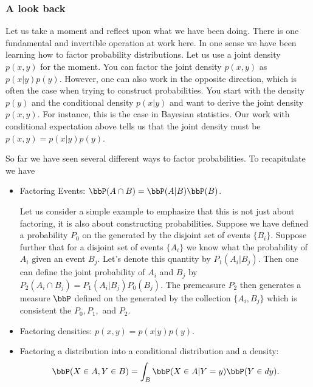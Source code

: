 \documentclass{report}
\begin{document}
\subsubsection{A look back}

Let us take a moment and reflect upon what we have been doing.  There is one fundamental and invertible operation at work here.  In one sense we have been learning how to factor probability distributions. Let us use a joint density $p(x,y)$ for the moment.  You can factor the joint density $p(x,y)$ as $p(x|y)p(y)$.  However, one can also work in the opposite direction, which is often the case when trying to construct probabilities.  You start with the density $p(y)$ and the conditional density $p(x|y)$ and want to derive the joint density $p(x,y)$.  For instance, this is the case in Bayesian statistics.  Our work with conditional expectation above tells us that the joint density must be $p(x,y) = p(x|y)p(y)$.

So far we have seen several different ways to factor probabilities.  To recapitulate we have
\begin{itemize}
\item Factoring Events: $\bbP(A \cap B) = \bbP(A | B) \bbP(B)$.  

Let us consider a simple example to emphasize that this is not just about factoring, it is also about constructing probabilities.  Suppose we have defined a probability $P_0$ on the \sigalg generated by the disjoint set of events $\{B_i\}$.  Suppose further that for a disjoint set of events $\{A_i\}$ we know what the probability of $A_i$ given an event $B_j$.  Let's denote this quantity by $P_1(A_i | B_j)$.  Then one can define the joint probability of $A_i$ and $B_j$ by $P_2(A_i \cap B_j) = P_1(A_i | B_j) P_0(B_j)$.  The premeasure $P_2$ then generates a measure $\bbP$ defined on the \sigalg generated by the collection $\{A_i,B_j\}$ which is consistent the $P_0, P_1,$ and $P_2$.
\item Factoring densities: $p(x,y) = p(x|y)p(y)$.
\item Factoring a distribution into a conditional distribution and a density:
\[
\bbP(X \in A, Y \in B) = \int_B \bbP(X \in A | Y = y) \bbP(Y \in dy).
\]
\end{itemize}
\end{document}
